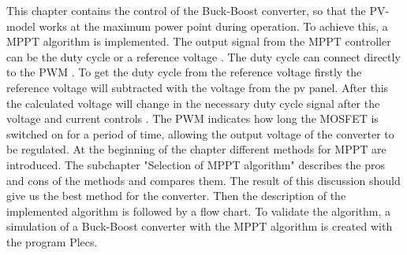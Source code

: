 This chapter contains the control of the Buck-Boost converter, so that the PV-model works at the maximum power point during operation. To achieve this, a MPPT algorithm is implemented. The output signal from the MPPT controller can be the duty cycle or a reference voltage . The duty cycle can connect directly to the PWM . To get the duty cycle from the reference voltage firstly the reference voltage will subtracted with the voltage from the pv panel. After this the calculated voltage will change in the necessary duty cycle signal after the voltage and current controls . The PWM indicates how long the MOSFET is switched on for a period of time, allowing the output voltage of the converter to be regulated.\newline
At the beginning of the chapter different methods for MPPT are introduced. The subchapter "Selection of MPPT algorithm" describes the pros and cons of the methods and compares them. The result of this discussion should give us the best method for the converter. Then the description of the implemented algorithm is followed by a flow chart. To validate the algorithm, a simulation of a Buck-Boost converter with the MPPT algorithm is created with the program Plecs.

